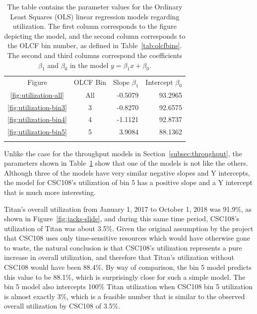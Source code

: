 \begin{table}
\caption{The table contains the parameter values for the Ordinary Least Squares
(OLS) linear regression models regarding utilization. The first column
corresponds to the figure depicting the model, and the second column
corresponds to the OLCF bin number, as defined in Table~\ref{tab:olcfbins}. The second and third columns correspond the coefficients $\beta_1$ and $\beta_0$ in 
the model $y = \beta_{1}x + \beta_0$.}
\label{tab:utilization-params}       %
\begin{tabular}{ccrr}
\hline\noalign{\smallskip}
Figure  & OLCF Bin & Slope $\beta_1$  & Intercept $\beta_0$  \\
\noalign{\smallskip}\hline\noalign{\smallskip}
\ref{fig:utilization-all}    &   All &  -0.5079 &   93.2965 \\
\ref{fig:utilization-bin3}   &   3   &  -0.8270 &   92.6575 \\
\ref{fig:utilization-bin4}   &   4   &  -1.1121 &   92.8737 \\
\ref{fig:utilization-bin5}   &   5   &  3.9084  &   88.1362 \\
\noalign{\smallskip}\hline
\end{tabular}
\end{table}

Unlike the case for the throughput models in Section~\ref{subsec:throughput},
the parameters shown in Table~\ref{tab:utilization-params} show that one of the
models is not like the others. Although three of the models have very similar
negative slopes and Y intercepts, the model for CSC108's utilization of bin 5
has a positive slope and a Y intercept that is much more interesting.

Titan's overall utilization from January 1, 2017 to October 1, 2018 was
91.9\%, as shown in Figure~\ref{fig:jacks-slide}, and during this same time
period, CSC108's utilization of Titan was about 3.5\%. Given the original
assumption by the project that CSC108 uses only time-sensitive resources which
would have otherwise gone to waste, the natural conclusion is that CSC108's
utilization represents a pure increase in overall utilization, and therefore
that Titan's utilization without CSC108 would have been 88.4\%. By way of
comparison, the bin 5 model predicts this value to be 88.1\%, which is
surprisingly close for such a simple model. The bin 5 model also intercepts
100\% Titan utilization when CSC108 bin 5 utilization is almost exactly 3\%,
which is a feasible number that is similar to the observed overall utilization
by CSC108 of 3.5\%.

